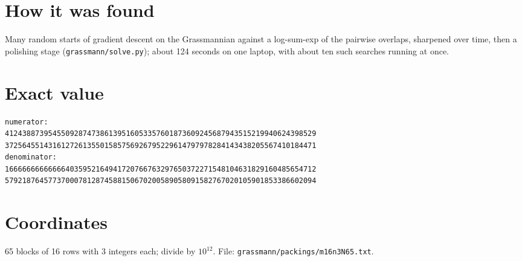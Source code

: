 \documentclass[11pt,a4paper]{article}
\begin{document}
\section{How it was found}
Many random starts of gradient descent on the Grassmannian against a log-sum-exp of the pairwise overlaps, sharpened over time, then a polishing stage (\texttt{grassmann/solve.py}); about 124 seconds on one laptop, with about ten such searches running at once.


\appendix
\section{Exact value}
{\small
\begin{verbatim}
numerator:
412438873954550928747386139516053357601873609245687943515219940624398529
372564551431612726135501585756926795229614797978284143438205567410184471
denominator:
166666666666664035952164941720766763297650372271548104631829160485654712
579218764577370007812874588150670200589058091582767020105901853386602094
\end{verbatim}}

\section{Coordinates}
65 blocks of 16 rows with 3 integers each; divide by $10^{12}$. File: \texttt{grassmann/packings/m16n3N65.txt}.
{\tiny
\begin{multicols}{3}
\end{multicols}}
\end{document}
